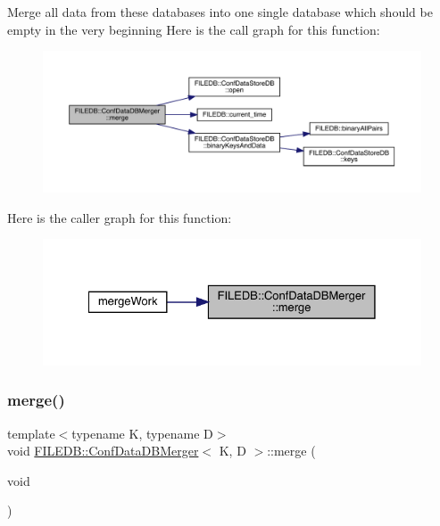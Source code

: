 Merge all data from these databases into one single database which should be empty in the very beginning Here is the call graph for this function\+:
\nopagebreak
\begin{figure}[H]
\begin{center}
\leavevmode
\includegraphics[width=350pt]{db/d60/classFILEDB_1_1ConfDataDBMerger_a6738f9880645518ba94eccd3b2037f24_cgraph}
\end{center}
\end{figure}
Here is the caller graph for this function\+:
\nopagebreak
\begin{figure}[H]
\begin{center}
\leavevmode
\includegraphics[width=328pt]{db/d60/classFILEDB_1_1ConfDataDBMerger_a6738f9880645518ba94eccd3b2037f24_icgraph}
\end{center}
\end{figure}
\mbox{\label{classFILEDB_1_1ConfDataDBMerger_a6738f9880645518ba94eccd3b2037f24}} 
\subsubsection{\texorpdfstring{merge()}{merge()}\hspace{0.1cm}{\footnotesize\ttfamily [2/3]}}
{\footnotesize\ttfamily template$<$typename K, typename D$>$ \\
void \mbox{\hyperlink{classFILEDB_1_1ConfDataDBMerger}{F\+I\+L\+E\+D\+B\+::\+Conf\+Data\+D\+B\+Merger}}$<$ K, D $>$\+::merge (\begin{DoxyParamCaption}\item[{void}]{ }\end{DoxyParamCaption})\hspace{0.3cm}{\ttfamily [inline]}}

